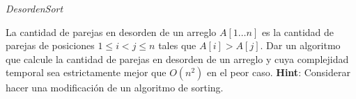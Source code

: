
\begin{enunciado}{\ejercicio[DesordenSort]}

  \textit{DesordenSort}

  La cantidad de parejas en desorden de un arreglo $A[1\ldots n]$ es la cantidad de parejas de posiciones $1\leq i < j \leq n$
  tales que $A[i] > A[j]$. Dar un algoritmo que calcule la cantidad de parejas en desorden de un arreglo
  y cuya complejidad temporal sea estrictamente mejor que $O(n^2)$ en el peor caso.
  \textbf{Hint}: Considerar hacer una modificación de un algoritmo de sorting.
\end{enunciado}

